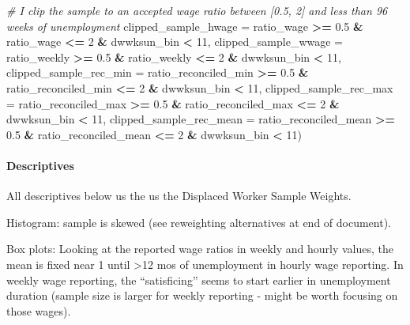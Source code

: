 \documentclass[
]{article}
\newenvironment{Shaded}{\begin{snugshade}}{\end{snugshade}}
\newcommand{\AttributeTok}[1]{\textcolor[rgb]{0.13,0.29,0.53}{#1}}
\newcommand{\CommentTok}[1]{\textcolor[rgb]{0.56,0.35,0.01}{\textit{#1}}}
\newcommand{\DecValTok}[1]{\textcolor[rgb]{0.00,0.00,0.81}{#1}}
\newcommand{\FloatTok}[1]{\textcolor[rgb]{0.00,0.00,0.81}{#1}}
\newcommand{\NormalTok}[1]{#1}
\newcommand{\SpecialCharTok}[1]{\textcolor[rgb]{0.81,0.36,0.00}{\textbf{#1}}}
\begin{document}
\begin{Shaded}
\begin{Highlighting}[]
         \CommentTok{\# I clip the sample to an accepted wage ratio between [0.5, 2] and less than 96 weeks of unemployment}
         \AttributeTok{clipped\_sample\_hwage =}\NormalTok{ ratio\_wage }\SpecialCharTok{\textgreater{}=} \FloatTok{0.5} \SpecialCharTok{\&}\NormalTok{ ratio\_wage }\SpecialCharTok{\textless{}=} \DecValTok{2} \SpecialCharTok{\&}\NormalTok{ dwwksun\_bin }\SpecialCharTok{\textless{}} \DecValTok{11}\NormalTok{,}
         \AttributeTok{clipped\_sample\_wwage =}\NormalTok{ ratio\_weekly }\SpecialCharTok{\textgreater{}=} \FloatTok{0.5} \SpecialCharTok{\&}\NormalTok{ ratio\_weekly }\SpecialCharTok{\textless{}=} \DecValTok{2}  \SpecialCharTok{\&}\NormalTok{ dwwksun\_bin }\SpecialCharTok{\textless{}} \DecValTok{11}\NormalTok{,}
         \AttributeTok{clipped\_sample\_rec\_min =}\NormalTok{ ratio\_reconciled\_min }\SpecialCharTok{\textgreater{}=} \FloatTok{0.5} \SpecialCharTok{\&}\NormalTok{ ratio\_reconciled\_min }\SpecialCharTok{\textless{}=} \DecValTok{2} \SpecialCharTok{\&}\NormalTok{ dwwksun\_bin }\SpecialCharTok{\textless{}} \DecValTok{11}\NormalTok{,}
         \AttributeTok{clipped\_sample\_rec\_max =}\NormalTok{ ratio\_reconciled\_max }\SpecialCharTok{\textgreater{}=} \FloatTok{0.5} \SpecialCharTok{\&}\NormalTok{ ratio\_reconciled\_max }\SpecialCharTok{\textless{}=} \DecValTok{2} \SpecialCharTok{\&}\NormalTok{ dwwksun\_bin }\SpecialCharTok{\textless{}} \DecValTok{11}\NormalTok{,}
         \AttributeTok{clipped\_sample\_rec\_mean =}\NormalTok{ ratio\_reconciled\_mean }\SpecialCharTok{\textgreater{}=} \FloatTok{0.5} \SpecialCharTok{\&}\NormalTok{ ratio\_reconciled\_mean }\SpecialCharTok{\textless{}=} \DecValTok{2} \SpecialCharTok{\&}\NormalTok{ dwwksun\_bin }\SpecialCharTok{\textless{}} \DecValTok{11}\NormalTok{)}
\end{Highlighting}
\end{Shaded}

\paragraph{Descriptives}\label{descriptives}

All descriptives below us the us the Displaced Worker Sample Weights.

Histogram: sample is skewed (see reweighting alternatives at end of
document).

Box plots: Looking at the reported wage ratios in weekly and hourly
values, the mean is fixed near 1 until \textgreater12 mos of
unemployment in hourly wage reporting. In weekly wage reporting, the
``satisficing'' seems to start earlier in unemployment duration (sample
size is larger for weekly reporting - might be worth focusing on those
wages).
\end{document}
